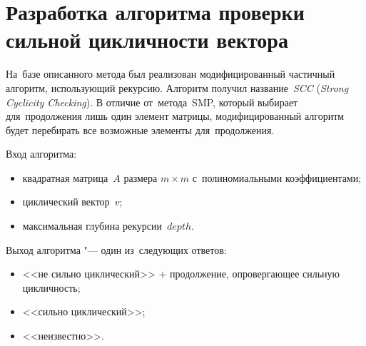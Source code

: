 \section{Разработка алгоритма проверки сильной цикличности вектора}

На~базе описанного метода был реализован модифицированный частичный алгоритм, использующий рекурсию.
Алгоритм получил название~\emph{SCC}
(\emph{Strong Cyclicity Check\-ing}).
В отличие от~метода~SMP, который выбирает для~продолжения лишь один элемент матрицы,
модифицированный алгоритм будет перебирать все возможные элементы для~продолжения.
\medskip

Вход алгоритма:
\begin{itemize}
    \item
        квадратная матрица~$A$ размера $m \times m$ с~полиномиальными коэффициентами;
    \item
        циклический вектор~$v$;
    \item
        максимальная глубина рекурсии~$depth$.
\end{itemize}

Выход алгоритма "--- один из~следующих ответов:
\begin{itemize}
    \item
        <<не сильно циклический>> + продолжение, опровергающее сильную цикличность;
    \item
        <<сильно циклический>>;
    \item
        <<неизвестно>>.
\end{itemize}

